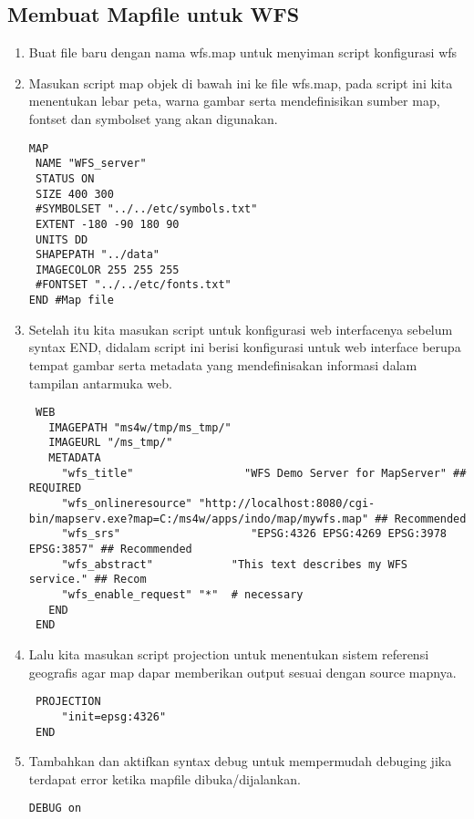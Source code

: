 \subsection{Membuat Mapfile untuk WFS}
\begin{enumerate}
\item Buat file baru dengan nama wfs.map untuk menyiman script konfigurasi wfs
\item Masukan script map objek di bawah ini ke file wfs.map, pada script ini kita menentukan lebar peta, warna gambar serta mendefinisikan sumber map, fontset dan symbolset yang akan digunakan. 

\begin{lstlisting}
MAP
 NAME "WFS_server"
 STATUS ON
 SIZE 400 300
 #SYMBOLSET "../../etc/symbols.txt"
 EXTENT -180 -90 180 90
 UNITS DD
 SHAPEPATH "../data"
 IMAGECOLOR 255 255 255
 #FONTSET "../../etc/fonts.txt"
END #Map file
\end{lstlisting}
\item Setelah itu kita masukan script untuk konfigurasi web interfacenya sebelum syntax END, didalam script ini berisi konfigurasi untuk web interface berupa tempat gambar serta metadata yang mendefinisakan informasi dalam tampilan antarmuka web.

\begin{lstlisting}
 WEB
   IMAGEPATH "ms4w/tmp/ms_tmp/"
   IMAGEURL "/ms_tmp/"
   METADATA
     "wfs_title"                 "WFS Demo Server for MapServer" ## REQUIRED
     "wfs_onlineresource" "http://localhost:8080/cgi-bin/mapserv.exe?map=C:/ms4w/apps/indo/map/mywfs.map" ## Recommended      
     "wfs_srs"                    "EPSG:4326 EPSG:4269 EPSG:3978 EPSG:3857" ## Recommended
     "wfs_abstract"            "This text describes my WFS service." ## Recom
     "wfs_enable_request" "*"  # necessary
   END
 END
\end{lstlisting}

\item Lalu kita masukan script projection  untuk menentukan sistem referensi geografis agar map dapar memberikan output sesuai dengan source mapnya.

\begin{lstlisting}
 PROJECTION
     "init=epsg:4326"
 END
\end{lstlisting}

\item Tambahkan dan aktifkan syntax debug untuk mempermudah debuging jika terdapat error ketika mapfile dibuka/dijalankan.
\begin{lstlisting}
DEBUG on
\end{lstlisting}


\end{enumerate}
